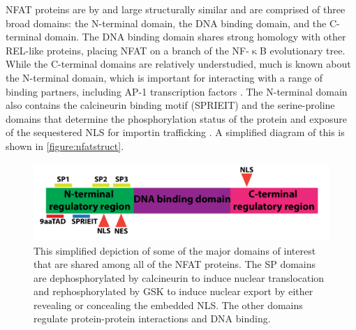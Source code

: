 NFAT proteins are by and large structurally similar and are comprised of three broad domains: the N-terminal domain, the DNA binding domain, and the C-terminal domain. The DNA binding domain shares strong homology with other REL-like proteins, placing NFAT on a branch of the NF-$\upkappa$B evolutionary tree. While the C-terminal domains are relatively understudied, much is known about the N-terminal domain, which is important for interacting with a range of binding partners, including AP-1 transcription factors \citep{Boise1993, Martinez2015}. The N-terminal domain also contains the calcineurin binding motif (SPRIEIT) and the serine-proline domains that determine the phosphorylation status of the protein and exposure of the sequestered NLS for importin trafficking \citep{Rao1997}. A simplified diagram of this is shown in \autoref{figure:nfatstruct}. 

\begin{figure}
\centering
\includegraphics[width=\textwidth]{images/nfatstruct.pdf}
\caption{This simplified depiction of some of the major domains of interest that are shared among all of the NFAT proteins. The SP domains are dephosphorylated by calcineurin to induce nuclear translocation and rephosphorylated by GSK to induce nuclear export by either revealing or concealing the embedded NLS. The other domains regulate protein-protein interactions and DNA binding.}
\label{figure:nfatstruct}
\end{figure}

